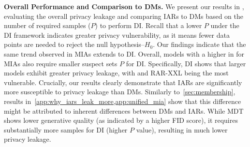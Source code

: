 \textbf{Overall Performance and Comparison to DMs.}
We present our results in , evaluating the overall privacy leakage and comparing IARs to DMs based on the number of required samples ($P$) to perform DI. Recall that a lower $P$ under the DI framework indicates greater privacy vulnerability, as it means fewer data points are needed to reject the null hypothesis--\(H_0\). Our findings indicate that the same trend observed in MIAs extends to DI. 
Overall, models with a higher \tprat in  for MIAs also require smaller suspect sets $P$ for DI.
Specifically, DI shows that larger models exhibit greater privacy leakage, with \varbig and RAR-XXL being the most vulnerable.
Crucially, our results clearly demonstrate that IARs are significantly more susceptible to privacy leakage than DMs. Similarly to~\cref{sec:membership}, results in~\cref{app:why_iars_leak_more,app:unified_mia} show that this difference might be attributed to inherent differences between DMs and IARs. While MDT shows lower generative quality (as indicated by a higher FID score), it requires substantially more samples for DI (higher $P$ value), resulting in much lower privacy leakage.





























